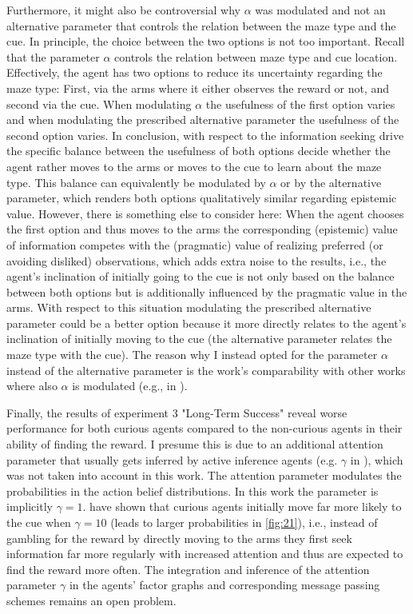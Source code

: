 Furthermore, it might also be controversial why \(\alpha\) was modulated and not an alternative parameter that controls the relation between the maze type and the cue. In principle, the choice between the two options is not too important. Recall that the parameter \(\alpha\) controls the relation between maze type and cue location. Effectively, the agent has two options to reduce its uncertainty regarding the maze type: First, via the arms where it either observes the reward or not, and second via the cue. When modulating \(\alpha\) the usefulness of the first option varies and when modulating the prescribed alternative parameter the usefulness of the second option varies. In conclusion, with respect to the information seeking drive the specific balance between the usefulness of both options decide whether the agent rather moves to the arms or moves to the cue to learn about the maze type. This balance can equivalently be modulated by \(\alpha\) or by the alternative parameter, which renders both options qualitatively similar regarding epistemic value. However, there is something else to consider here: When the agent chooses the first option and thus moves to the arms the corresponding (epistemic) value of information competes with the (pragmatic) value of realizing preferred (or avoiding disliked) observations, which adds extra noise to the results, i.e., the agent's inclination of initially going to the cue is not only based on the balance between both options but is additionally influenced by the pragmatic value in the arms. With respect to this situation modulating the prescribed alternative parameter could be a better option because it more directly relates to the agent's inclination of initially moving to the cue (the alternative parameter relates the maze type with the cue). The reason why I instead opted for the parameter \(\alpha\) instead of the alternative parameter is the work's comparability with other works where also \(\alpha\) is modulated (e.g., in \cite{friston2015,delaar2025}).

Finally, the results of experiment 3 "Long-Term Success" reveal worse performance for both curious agents compared to the non-curious agents in their ability of finding the reward. I presume this is due to an additional attention parameter that usually gets inferred by active inference agents (e.g. \(\gamma\) in \cite{friston2015}), which was not taken into account in this work. The attention parameter modulates the probabilities in the action belief distributions. In this work the parameter is implicitly \(\gamma = 1\). \textcite{delaar2023} have shown that curious agents initially move far more likely to the cue when \(\gamma = 10\) (leads to larger probabilities in \cref{fig:21}), i.e., instead of gambling for the reward by directly moving to the arms they first seek information far more regularly with increased attention and thus are expected to find the reward more often. The integration and inference of the attention parameter \(\gamma\) in the agents' factor graphs and corresponding message passing schemes remains an open problem.


